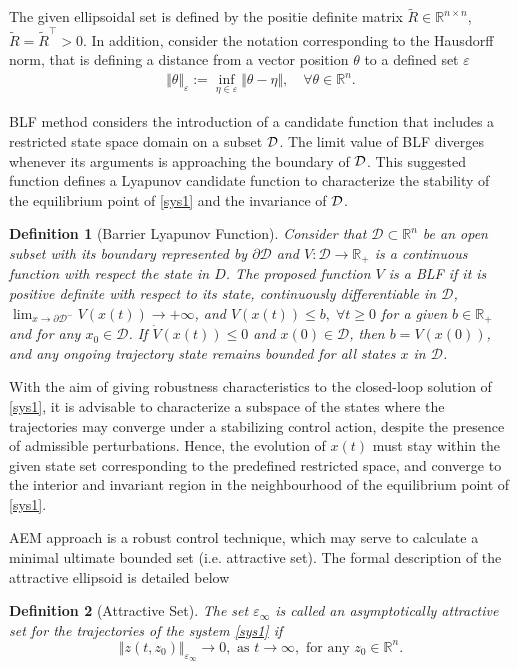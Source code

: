 \documentclass[journal,twocolumn]{IEEEtran}
\newtheorem{definition}{Definition}
\begin{document}
 
The given ellipsoidal set is defined by the positie definite matrix $\tilde{R}\in \mathbb{R}^{n \times n}$,  $\tilde{R}=\tilde{R}^{\top} > 0$. In addition, consider the notation corresponding to the Hausdorff norm, that is defining a distance from a vector position $\theta$ to a defined set $\varepsilon$
%
\begin{align*}
    \Vert \theta \Vert_{\varepsilon}:= \inf_{\eta \in \varepsilon} \Vert \theta-\eta \Vert, \quad \forall  \theta \in \mathbb{R}^n.
\end{align*}
%

BLF \cite{tee2009} method considers the introduction of a candidate function that includes a restricted state space domain on a subset ${\cal D}$. The limit value of BLF diverges whenever its arguments is approaching the boundary of ${\cal D}$. This suggested function defines a Lyapunov candidate function to characterize the stability of the equilibrium point of \eqref{sys1} and the invariance of ${\cal D}$.
\begin{definition}[Barrier Lyapunov Function]\cite{tee2009} Consider that  $\mathcal{D} \subset \mathbb{R}^n$ be an open subset with its boundary represented by $\partial \mathcal{D}$ and $V: \mathcal{D} \rightarrow \mathbb{R}_+$ is a continuous function with respect the state in $D$. The proposed function $V$ is a BLF if it is positive definite with respect to its state, continuously differentiable in $\mathcal{D}$, $ \lim_{x \rightarrow \partial \mathcal{D}^{-}} V(x(t)) \rightarrow +\infty$,  and $V(x(t)) \leq b, \; \forall t\geq 0$  for a given $b \in \mathbb{R}_+$ and for any $x_{0} \in \mathcal{D}$. If $\dot{V}(x(t))\leq 0$ and $x(0)\in \mathcal{D}$, then $b=V(x(0))$, and any ongoing trajectory state remains bounded for all states $x$ in $\mathcal{D}$.
\end{definition}

With the aim of giving robustness characteristics to the closed-loop solution of \eqref{sys1}, it is advisable to characterize a subspace of the states where the trajectories may converge under a stabilizing control action, despite the presence of admissible perturbations. Hence, the evolution of $x(t)$ must stay within the given state set corresponding to the predefined restricted space, and converge to the interior and invariant region in the neighbourhood of the equilibrium point of \eqref{sys1}. 

AEM approach \cite{poznyakAEM,mera_polyakov,kurzshanski} is a robust control technique, which may serve to calculate a minimal ultimate bounded set (i.e. attractive set). The formal description of the attractive ellipsoid is detailed below
%
\begin{definition}[Attractive Set]\cite{poznyakAEM}
 The set $\varepsilon_{\infty}$ is called an asymptotically attractive set for the trajectories of the system \eqref{sys1} if 
 \begin{equation*} 
  \Vert z(t, z_0) \Vert_{\varepsilon_{\infty}} \rightarrow 0, \text{ as } t \rightarrow \infty, \text{ for any } z_0 \in \mathbb{R}^n.
 \end{equation*}
\end{definition}
\end{document}
